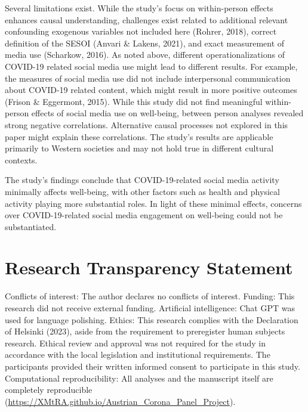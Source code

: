 \documentclass[
  man,mask,floatsintext]{apa7}
\begin{document}
Several limitations exist. While the study's focus on within-person effects enhances causal understanding, challenges exist related to additional relevant confounding exogenous variables not included here (Rohrer, 2018), correct definition of the SESOI (Anvari \& Lakens, 2021), and exact measurement of media use (Scharkow, 2016).
As noted above, different operationalizations of COVID-19 related social media use might lead to different results.
For example, the measures of social media use did not include interpersonal communication about COVID-19 related content, which might result in more positive outcomes (Frison \& Eggermont, 2015).
While this study did not find meaningful within-person effects of social media use on well-being, between person analyses revealed strong negative correlations.
Alternative causal processes not explored in this paper might explain these correlations.
The study's results are applicable primarily to Western societies and may not hold true in different cultural contexts.

The study's findings conclude that COVID-19-related social media activity minimally affects well-being, with other factors such as health and physical activity playing more substantial roles.
In light of these minimal effects, concerns over COVID-19-related social media engagement on well-being could not be substantiated.

\newpage

\section{Research Transparency Statement}\label{research-transparency-statement}

Conflicts of interest: The author declares no conflicts of interest. Funding: This research did not receive external funding. Artificial intelligence: Chat GPT was used for language polishing. Ethics: This research complies with the Declaration of Helsinki (2023), aside from the requirement to preregister human subjects research. Ethical review and approval was not required for the study in accordance with the local legislation and institutional requirements. The participants provided their written informed consent to participate in this study. Computational reproducibility: All analyses and the manuscript itself are completely reproducible (\url{https://XMtRA.github.io/Austrian_Corona_Panel_Project}).
\end{document}
